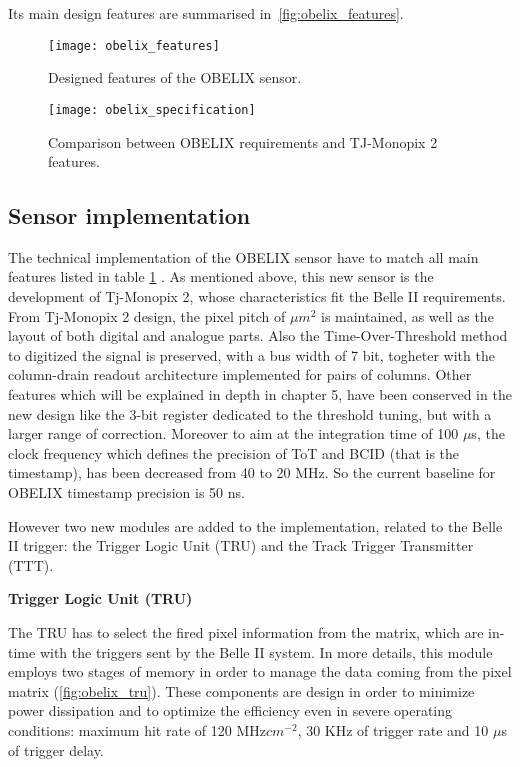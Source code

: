 Its main design features are summarised in~\autoref{fig:obelix_features}.


\begin{figure}[h!]
\centering
\texttt{[image: obelix\_features]}
\caption{Designed features of the OBELIX sensor.}
\label{fig:obelix_features}
\end{figure}

\begin{figure}[h!]
\centering
\texttt{[image: obelix\_specification]}
\caption{Comparison between OBELIX requirements and TJ-Monopix 2 features.}
\label{fig:obelix_specification}
\end{figure}

\subsection{Sensor implementation}

The technical implementation of the OBELIX sensor have to match all main features listed in table \ref{fig:obelix_features} .
As mentioned above, this new sensor is the development of Tj-Monopix 2, whose characteristics fit the Belle II requirements.\\

From Tj-Monopix 2 design, the pixel pitch of  $\mu m^{2}$ is maintained, as well as the layout of both digital and analogue parts. Also the Time-Over-Threshold method to digitized the signal is preserved, with a bus width of 7 bit, togheter with the column-drain readout architecture implemented for pairs of columns. Other features which will be explained in depth in chapter 5, have been conserved in the new design like the 3-bit register dedicated to the threshold tuning, but with a larger range of correction. 
Moreover to aim at the integration time of 100 $\mu$s, the clock frequency which defines the precision of ToT and BCID (that is the timestamp), has been decreased from 40 to 20 MHz. So the current baseline for OBELIX timestamp precision is 50 ns.

However two new modules are added to the implementation, related to the Belle II trigger: the Trigger Logic Unit (TRU) and the Track Trigger Transmitter (TTT). %

\begin{description}
\item \textbf{Trigger Logic Unit (TRU)}
\end{description}

The TRU has to select the fired pixel information from the matrix, which are in-time with the triggers sent by the Belle II system. In more details, this module employs two stages of memory in order to manage the data coming from the pixel matrix (\autoref{fig:obelix_tru}). These components are design in order to minimize power dissipation and to optimize the efficiency even in severe operating conditions: maximum hit rate of 120 MHz$cm^{-2}$, 30 KHz of trigger rate and 10 $\mu$s of trigger delay.

